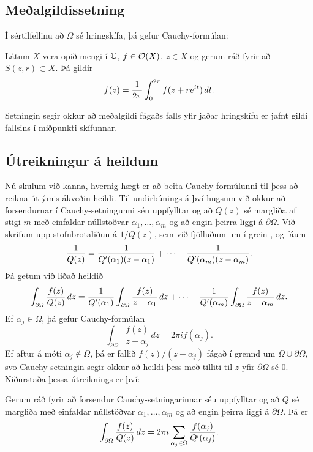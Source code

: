 \subsection*{Meðalgildissetning}

Í sértilfellinu að $\Omega$ sé hringskífa, þá gefur Cauchy-formúlan:

\begin{se}  
Látum $X$ vera opið mengi í ${\mathbb C}$, $f\in
{\cal O}(X)$,  $z\in X$
og gerum ráð fyrir að $\overline S(z,r)\subset X$.  
Þá  gildir
 $$f(z)=\dfrac 1{2\pi} \int_0\sp{2\pi}f(z+re\sp{it})\, dt.
 $$
\end{se}


Setningin segir okkur að meðalgildi fágaðs falls yfir jaðar
hringskífu er jafnt gildi fallsins í miðpunkti skífunnar.


\subsection*{Útreikningur á heildum}

Nú skulum við kanna, hvernig hægt er að beita Cauchy-formúlunni til
þess að reikna út ýmis ákveðin heildi.  Til undirbúnings á því hugsum
við okkur að forsendurnar í Cauchy-setningunni séu uppfylltar og að
$Q(z)$ sé margliða af stigi $m$ með einfaldar núllstöðvar
$\alpha_1,\dots,\alpha_m$ og að engin þeirra liggi á
$\partial\Omega$.  Við skrifum upp stofnbrotaliðun á $1/Q(z)$, sem
við fjölluðum um í grein , og fáum 
 $$\dfrac 1{Q(z)} = \dfrac 1{Q{\sp{\prime}}(\alpha_1)(z-\alpha_1)}+\cdots+
\dfrac 1{Q{\sp{\prime}}(\alpha_m)(z-\alpha_m)}.
 $$
Þá getum við liðað heildið
 $$\int_{\partial\Omega}\dfrac{f(z)}{Q(z)}\, dz =
\dfrac 1{Q{\sp{\prime}}(\alpha_1)}\int_{\partial\Omega}\dfrac{f(z)}{z-\alpha_1}\,
dz 
+\cdots+
\dfrac 1{Q{\sp{\prime}}(\alpha_m)}\int_{\partial\Omega}\dfrac{f(z)}{z-\alpha_m}\,
dz. 
 $$
Ef $\alpha_j\in \Omega$, þá gefur Cauchy-formúlan
$$
\int_{\partial\Omega}\dfrac{f(z)}{z-\alpha_j}\,
dz  = 2\pi i f(\alpha_j).
$$
Ef aftur á móti $\alpha_j\not\in\Omega$, þá er fallið
$f(z)/(z-\alpha_j)$ fágað í grennd um $\Omega\cup\partial\Omega$, svo
Cauchy-setningin segir okkur að heildi þess með tilliti til $z$ yfir
$\partial\Omega$ sé $0$.  Niðurstaða þessa útreiknings er því:

\begin{se}\label{set10.2.6}
Gerum ráð fyrir að forsendur Cauchy-setningarinnar séu uppfylltar og
að $Q$ sé margliða með einfaldar núllstöðvar
$\alpha_1,\dots,\alpha_m$ og að engin þeirra liggi á
$\partial\Omega$.  Þá er
 \begin{equation*}\int_{\partial\Omega} \dfrac{f(z)}{Q(z)} \, dz =
2\pi i\sum_{\alpha_j\in \Omega}
\dfrac{f(\alpha_j)}{Q{\sp{\prime}}(\alpha_j)}.
\label{10.2.10}
 \end{equation*}
\end{se}

